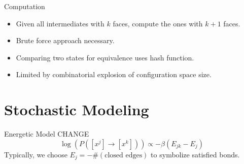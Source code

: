 \documentclass{beamer}
\begin{document}
\begin{frame}{Computation}
\begin{itemize}
\item Given all intermediates with $k$ faces, compute the ones with $k+1$ faces.
\item Brute force approach necessary.  
\item Comparing two states for equivalence uses hash function. 
\item Limited by combinatorial explosion of configuration space size.
\end{itemize}
\end{frame}

\section{Stochastic Modeling}
\begin{frame}{Energetic Model}
CHANGE
  \centering
$$\log\left(P([x^j] \to [x^k]) \right) \propto -\beta(E_{jk} - E_j)$$
Typically, we choose $E_j = -\#\left(\text{closed edges}\right)$ to symbolize satisfied bonds. 
\end{frame}
\end{document}
